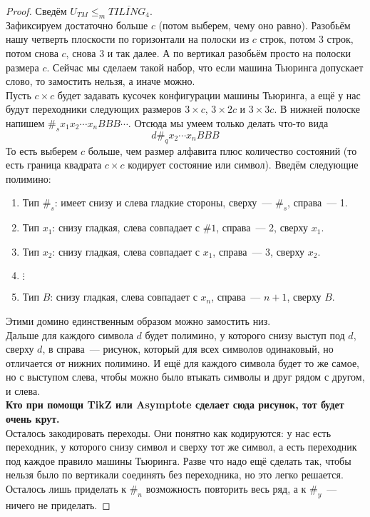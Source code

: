 \documentclass{article}
\begin{document}
    \begin{proof}
        Сведём $U_{TM}\leqslant_m\overline{TILING_4}$.\\
        Зафиксируем достаточно больше $c$ (потом выберем, чему оно равно). Разобьём нашу четверть плоскости по горизонтали на полоски из $c$ строк, потом 3 строк, потом снова $c$, снова 3 и так далее. А по вертикал разобьём просто на полоски размера $c$. Сейчас мы сделаем такой набор, что если машина Тьюринга допускает слово, то замостить нельзя, а иначе можно.\\
        Пусть $c\times c$ будет задавать кусочек конфигурации машины Тьюринга, а ещё у нас будут переходники следующих размеров $3\times c$, $3\times 2c$ и $3\times 3c$. В нижней полоске напишем $\#_sx_1x_2\cdots x_nBBB\cdots$. Отсюда мы умеем только делать что-то вида
        $$
        d\#_qx_2\cdots x_nBBB
        $$
        То есть выберем $c$ больше, чем размер алфавита плюс количество состояний (то есть граница квадрата $c\times c$ кодирует состояние или символ). Введём следующие полимино:
        \begin{enumerate}
            \item Тип $\#_s$: имеет снизу и слева гладкие стороны, сверху~--- $\#_s$, справа~--- 1.
            \item Тип $x_1$: снизу гладкая, слева совпадает с $\#1$, справа~--- 2, сверху $x_1$.
            \item Тип $x_2$: снизу гладкая, слева совпадает с $x_1$, справа~--- 3, сверху $x_2$.
            \item $\vdots$
            \item Тип $B$: снизу гладкая, слева совпадает с $x_n$, справа~--- $n+1$, сверху $B$.
        \end{enumerate}
        Этими домино единственным образом можно замостить низ.\\
        Дальше для каждого символа $d$ будет полимино, у которого снизу выступ под $d$, сверху $d$, в справа~--- рисунок, который для всех символов одинаковый, но отличается от нижних полимино. И ещё для каждого символа будет то же самое, но с выступом слева, чтобы можно было втыкать символы и друг рядом с другом, и слева.\\
        {\bf\LARGE Кто при помощи TikZ или Asymptote сделает сюда рисунок, тот будет очень крут.\\}
        Осталось закодировать переходы. Они понятно как кодируются: у нас есть переходник, у которого снизу символ и сверху тот же символ, а есть переходник под каждое правило машины Тьюринга. Разве что надо ещё сделать так, чтобы нельзя было по вертикали соединять без переходника, но это легко решается.\\
        Осталось лишь приделать к $\#_n$ возможность повторить весь ряд, а к $\#_y$~--- ничего не приделать.
    \end{proof}
\end{document}
